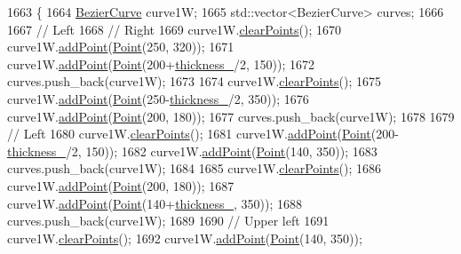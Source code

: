 \begin{DoxyCode}
1663                \{
1664     \mbox{\hyperlink{class_bezier_curve}{BezierCurve}} curve1W;
1665     std::vector<BezierCurve> curves;
1666 
1667     \textcolor{comment}{// Left}
1668     \textcolor{comment}{// Right}
1669     curve1W.\mbox{\hyperlink{class_bezier_curve_a0ba8ce66d5af5971ae6a1b506029728e}{clearPoints}}();
1670     curve1W.\mbox{\hyperlink{class_bezier_curve_a38d16c18b36ae45619b05e26e226cf34}{addPoint}}(\mbox{\hyperlink{class_point}{Point}}(250, 320));
1671     curve1W.\mbox{\hyperlink{class_bezier_curve_a38d16c18b36ae45619b05e26e226cf34}{addPoint}}(\mbox{\hyperlink{class_point}{Point}}(200+\mbox{\hyperlink{class_font_v1_aed8040e76be9a52833627b92f0fb4e5f}{thickness\_}}/2, 150));
1672     curves.push\_back(curve1W);
1673 
1674     curve1W.\mbox{\hyperlink{class_bezier_curve_a0ba8ce66d5af5971ae6a1b506029728e}{clearPoints}}();
1675     curve1W.\mbox{\hyperlink{class_bezier_curve_a38d16c18b36ae45619b05e26e226cf34}{addPoint}}(\mbox{\hyperlink{class_point}{Point}}(250-\mbox{\hyperlink{class_font_v1_aed8040e76be9a52833627b92f0fb4e5f}{thickness\_}}/2, 350));
1676     curve1W.\mbox{\hyperlink{class_bezier_curve_a38d16c18b36ae45619b05e26e226cf34}{addPoint}}(\mbox{\hyperlink{class_point}{Point}}(200, 180));
1677     curves.push\_back(curve1W);
1678 
1679     \textcolor{comment}{// Left}
1680     curve1W.\mbox{\hyperlink{class_bezier_curve_a0ba8ce66d5af5971ae6a1b506029728e}{clearPoints}}();
1681     curve1W.\mbox{\hyperlink{class_bezier_curve_a38d16c18b36ae45619b05e26e226cf34}{addPoint}}(\mbox{\hyperlink{class_point}{Point}}(200-\mbox{\hyperlink{class_font_v1_aed8040e76be9a52833627b92f0fb4e5f}{thickness\_}}/2, 150));
1682     curve1W.\mbox{\hyperlink{class_bezier_curve_a38d16c18b36ae45619b05e26e226cf34}{addPoint}}(\mbox{\hyperlink{class_point}{Point}}(140, 350));
1683     curves.push\_back(curve1W);
1684 
1685     curve1W.\mbox{\hyperlink{class_bezier_curve_a0ba8ce66d5af5971ae6a1b506029728e}{clearPoints}}();
1686     curve1W.\mbox{\hyperlink{class_bezier_curve_a38d16c18b36ae45619b05e26e226cf34}{addPoint}}(\mbox{\hyperlink{class_point}{Point}}(200, 180));
1687     curve1W.\mbox{\hyperlink{class_bezier_curve_a38d16c18b36ae45619b05e26e226cf34}{addPoint}}(\mbox{\hyperlink{class_point}{Point}}(140+\mbox{\hyperlink{class_font_v1_aed8040e76be9a52833627b92f0fb4e5f}{thickness\_}}, 350));
1688     curves.push\_back(curve1W);
1689 
1690     \textcolor{comment}{// Upper left}
1691     curve1W.\mbox{\hyperlink{class_bezier_curve_a0ba8ce66d5af5971ae6a1b506029728e}{clearPoints}}();
1692     curve1W.\mbox{\hyperlink{class_bezier_curve_a38d16c18b36ae45619b05e26e226cf34}{addPoint}}(\mbox{\hyperlink{class_point}{Point}}(140, 350));

\end{DoxyCode}
